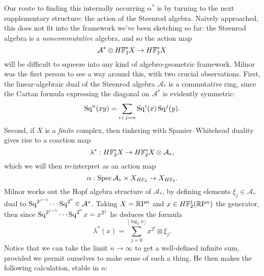 Our route to finding this internally occurring $\alpha^*$ is by turning to the next supplementary structure: the action of the Steenrod algebra.  Naively approached, this does not fit into the framework we've been sketching so far: the Steenrod algebra is a \emph{noncommutative} algebra, and so the action map \[\mathcal A^* \otimes H\mathbb F_2^* X \to H\mathbb F_2^* X\] will be difficult to squeeze into any kind of algebro-geometric framework.  Milnor was the first person to see a way around this, with two crucial observations.  First, the linear-algebraic dual of the Steenrod algebra $\mathcal A_*$ is a commutative ring, since the Cartan formula expressing the diagonal on $\mathcal A^*$ is evidently symmetric: \[\operatorname{Sq}^n(x y) = \sum_{i+j=n} \operatorname{Sq}^i(x) \operatorname{Sq}^j(y).\]
  Second, if $X$ is a \emph{finite} complex, then tinkering with Spanier--Whitehead duality
gives rise to a coaction map \[\lambda^*: H\mathbb F_2^* X \to H\mathbb F_2^* X \otimes \mathcal A_*,\] which we will then re-interpret as an action map \[\alpha: \operatorname{Spec} \mathcal A_* \times X_{H\mathbb F_2} \to X_{H\mathbb F_2}.\]  Milnor works out the Hopf algebra structure of $\mathcal A_*$, by defining elements $\xi_j \in \mathcal A_*$ dual to $\operatorname{Sq}^{2^{j-1}} \cdots \operatorname{Sq}^{2^0} \in \mathcal A^*$.  Taking $X = \mathbb R\mathrm P^n$ and $x \in H\mathbb F_2^1(\mathbb R\mathrm P^n)$ the generator, then since $\operatorname{Sq}^{2^{j-1}} \cdots \operatorname{Sq}^{2^0} x = x^{2^j}$ he deduces the formula \[\lambda^*(x) = \sum_{j=0}^{\lfloor \log_2 n \rfloor} x^{2^j} \otimes \xi_j.\]  Notice that we can take the limit $n \to \infty$ to get a well-defined infinite sum, provided we permit ourselves to make sense of such a thing.  He then makes the following calculation, stable in $n$:
